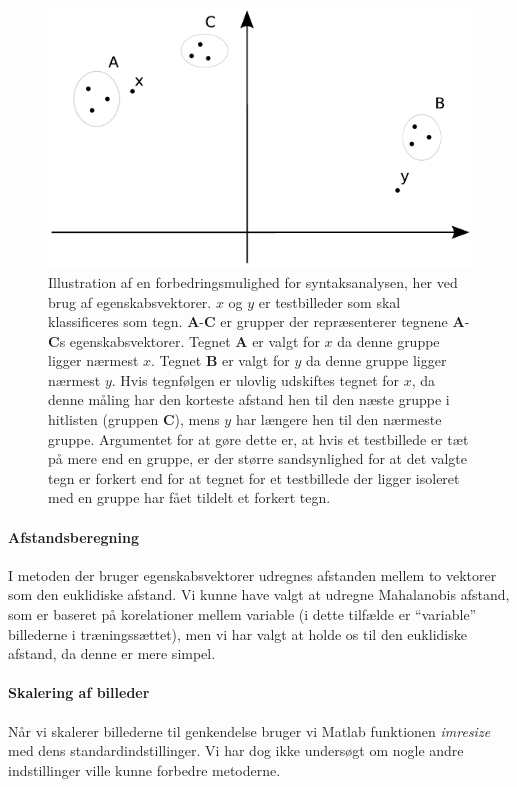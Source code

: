 \begin{figure}[htp]
\centering
\includegraphics{implementation/illu/syntaks_forbedring.pdf}
\caption{Illustration af en forbedringsmulighed for syntaksanalysen, her ved brug af egenskabsvektorer. $x$ og $y$ er testbilleder som skal klassificeres som tegn. \textbf{A}-\textbf{C} er grupper der repræsenterer tegnene \textbf{A}-\textbf{C}s egenskabsvektorer. Tegnet \textbf{A} er valgt for $x$ da denne gruppe ligger nærmest $x$. Tegnet \textbf{B} er valgt for $y$ da denne gruppe ligger nærmest $y$. Hvis tegnfølgen er ulovlig udskiftes tegnet for $x$, da denne måling har den korteste afstand hen til den næste gruppe i hitlisten (gruppen \textbf{C}), mens $y$ har længere hen til den nærmeste gruppe. Argumentet for at gøre dette er, at hvis et testbillede er tæt på mere end en gruppe, er der større sandsynlighed for at det valgte tegn er forkert end for at tegnet for et testbillede der ligger isoleret med en gruppe har fået tildelt et forkert tegn.}
\label{fig:syntaks_forbedring}
\end{figure}

\paragraph{Afstandsberegning}
I metoden der bruger egenskabsvektorer udregnes afstanden mellem to vektorer som den euklidiske afstand. Vi kunne have valgt at udregne Mahalanobis afstand, som er baseret på korelationer mellem variable (i dette tilfælde er ``variable'' billederne i træningssættet), men vi har valgt at holde os til den euklidiske afstand, da denne er mere simpel.

\paragraph{Skalering af billeder}
Når vi skalerer billederne til genkendelse bruger vi Matlab funktionen \textit{imresize} med dens standardindstillinger. Vi har dog ikke undersøgt om nogle andre indstillinger ville kunne forbedre metoderne.